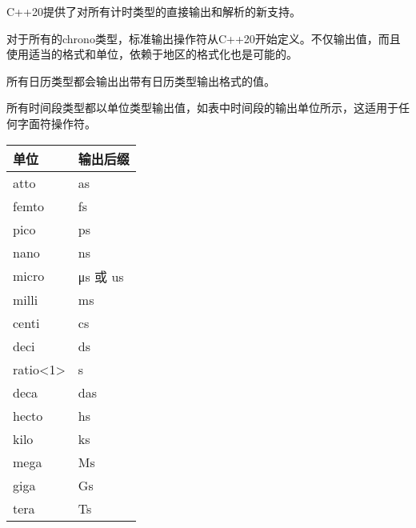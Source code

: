 
C++20提供了对所有计时类型的直接输出和解析的新支持。


对于所有的chrono类型，标准输出操作符从C++20开始定义。不仅输出值，而且使用适当的格式和单位，依赖于地区的格式化也是可能的。

所有日历类型都会输出出带有日历类型输出格式的值。

所有时间段类型都以单位类型输出值，如表中时间段的输出单位所示，这适用于任何字面符操作符。

\begin{longtable}[c]{|l|l|}
\hline
\textbf{单位}                          & \textbf{输出后缀} \\ \hline
\endfirsthead
%
\endhead
%
atto                                   & as                     \\ \hline
femto                                  & fs                     \\ \hline
pico                                   & ps                     \\ \hline
nano                                   & ns                     \\ \hline
micro                                  & μs 或 us               \\ \hline
milli                                  & ms                     \\ \hline
centi                                  & cs                     \\ \hline
deci                                   & ds                     \\ \hline
ratio\textless{}1\textgreater{}        & s                      \\ \hline
deca                                   & das                    \\ \hline
hecto                                  & hs                     \\ \hline
kilo                                   & ks                     \\ \hline
mega                                   & Ms                     \\ \hline
giga                                   & Gs                     \\ \hline
tera                                   & Ts                     \\ \hline

\end{longtable}
